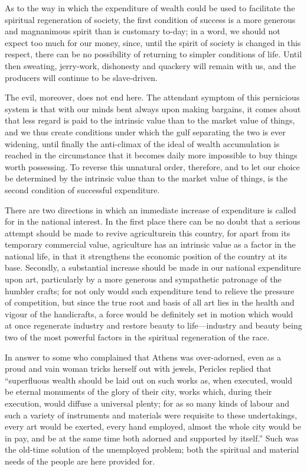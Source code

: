 \documentclass{book}
\begin{document}
As to the way in which the expenditure of wealth could be used to facilitate the spiritual regeneration of society, the first condition of success is a more generous and magnanimous spirit than is customary to-day; in a word, we should not expect too much for our money, since, until the spirit of society is changed in this respect, there can be no possibility of returning to simpler conditions of life. Until then sweating, jerry-work, dishonesty and quackery will remain with us, and the producers will continue to be slave-driven.

The evil, moreover, does not end here. The attendant symptom of this pernicious system is that with our minds bent always upon making bargains, it comes about that less regard is paid to the intrinsic value than to the market value of things, and we thus create conditions under which the gulf separating the two is ever widening, until finally the anti-climax of the ideal of wealth accumulation is reached in the circumstance that it becomes daily more impossible to buy things worth possessing. To reverse this unnatural order, therefore, and to let our choice be determined by the intrinsic value than to the market value of things, is the second condition of successful expenditure.

There are two directions in which an immediate increase of expenditure is called for in the national interest. In the first place there can be no doubt that a serious attempt should be made to revive agriculture\footnotemark[1] in this country, for apart from its temporary commercial value, agriculture has an intrinsic value as a factor in the national life, in that it strengthens the economic position of the country at its base. Secondly, a substantial increase should be made in our national expenditure upon art, particularly by a more generous and sympathetic patronage of the humbler crafts; for not only would such expenditure tend to relieve the pressure of competition, but since the true root and basis of all art lies in the health and vigour of the handicrafts, a force would be definitely set in motion which would at once regenerate industry and restore beauty to life—industry and beauty being two of the most powerful factors in the spiritual regeneration of the race.

In answer to some who complained that Athens was over-adorned, even as a proud and vain woman tricks herself out with jewels, Pericles replied that “superfluous wealth should be laid out on such works as, when executed, would be eternal monuments of the glory of their city, works which, during their execution, would diffuse a universal plenty; for as so many kinds of labour and such a variety of instruments and materials were requisite to these undertakings, every art would be exerted, every hand employed, almost the whole city would be in pay, and be at the same time both adorned and supported by itself.” Such was the old-time solution of the unemployed problem; both the spiritual and material needs of the people are here provided for.
\end{document}
